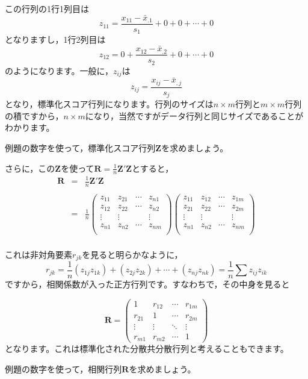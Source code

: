 \documentclass{ltjsbook}
\begin{document}
この行列の1行1列目は
\[ z_{11} = \frac{x_{11}-\bar{x}_{.1}}{s_1}+0+0+\cdots+0 \]
となりますし，1行2列目は
\[ z_{12} = 0 + \frac{x_{12}-\bar{x}_{.2}}{s_2} + 0 + \cdots + 0\]
のようになります。一般に，$z_{ij}$は
\[ z_{ij} = \frac{x_{ij}-\bar{x}_{,j}}{s_j} \]
となり，標準化スコア行列になります。行列のサイズは$n \times m$行列と$m \times m$行列の積ですから，$n \times m$になり，当然ですがデータ行列と同じサイズであることがわかります。

\begin{reidai}{}{}
	例題の数字を使って，標準化スコア行列$\bm{Z}$を求めましょう。
\end{reidai}
さらに，この$\bm{Z}$を使って$\bm{R}=\frac{1}{n}\bm{Z}'\bm{Z}$とすると，
\[
	\begin{array}{ccl}
		\bm{R} & = & \frac{1}{n}\bm{Z}' \bm{Z} \\
		       &   &                           \\
		       & = & \frac{1}{n}
		\begin{pmatrix}
			z_{11} & z_{21} & \cdots & z_{n1} \\
			z_{12} & z_{22} & \cdots & z_{n2} \\
			\vdots & \vdots &        & \vdots \\
			z_{n1} & z_{n2} & \cdots & z_{nm} \\
		\end{pmatrix}
		\begin{pmatrix}
			z_{11} & z_{12} & \cdots & z_{1m} \\
			z_{21} & z_{22} & \cdots & z_{2m} \\
			\vdots & \vdots &        & \vdots \\
			z_{n1} & z_{n2} & \cdots & z_{nm} \\
		\end{pmatrix}      \\
	\end{array}
\]

これは非対角要素$r_{jk}$を見ると明らかなように，
\[ r_{jk} = \frac{1}{n}(z_{1j}z_{1k})+(z_{2j}z_{2k})+\cdots+(z_{nj}z_{nk}) = \frac{1}{n}\sum z_{ij}z_{ik} \]
ですから，相関係数が入った正方行列です。すなわちで，その中身を見ると

\[
	\bm{R} = \begin{pmatrix} 1      & r_{12} & \cdots & r_{1m} \\
                r_{21} & 1      & \cdots & r_{2m} \\
                \vdots & \vdots & \ddots & \vdots \\
                r_{m1} & r_{m2} & \cdots & 1\end{pmatrix}
\]
となります。これは標準化された分散共分散行列と考えることもできます。
\begin{reidai}{}{}
	例題の数字を使って，相関行列$\bm{R}$を求めましょう。
\end{reidai}
\end{document}
